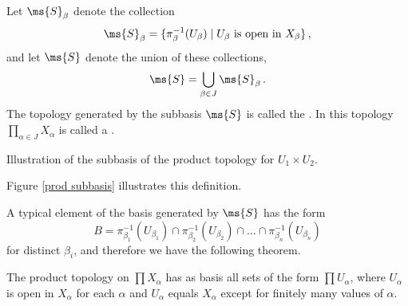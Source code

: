 \begin{definition}
	Let $\ms{S}_\beta$ denote the collection
	\[
		\ms{S}_\beta = \{ \pi_\beta^{-1}(U_\beta) \mid U_\beta 
		\text{ 
		is open in } X_\beta \}\,,
	\]
	and let $\ms{S}$ denote the union of these collections,
	\[
		\ms{S} = \bigcup_{\beta \in J} \ms{S}_\beta\,.
	\]
	The topology generated by the subbasis $\ms{S}$ is called the 
	. In this 
	topology $\prod_{\alpha \in J} X_\alpha$ is called a 
	.
\end{definition}

\begin{marginfigure}
	\centering
	\caption{Illustration of the subbasis of the 
	product topology for $U_1 \times U_2$.}\label{prod subbasis}
\end{marginfigure}

Figure \ref{prod subbasis} illustrates this definition.

A typical element of the basis generated by $\ms{S}$ has the form
\[
	B = \pi_{\beta_1}^{-1}(U_{\beta_1}) \cap 
	\pi_{\beta_2}^{-1}(U_{\beta_2}) \cap 
	\dots \cap 
	\pi_{\beta_n}^{-1}(U_{\beta_n})
\]
for distinct $\beta_i$, and therefore we have the following theorem.

\begin{theorem}
	The product topology on $\prod 	X_\alpha$ has as basis all sets 
	of the form $\prod U_\alpha$, where $U_\alpha$ is open in 
	$X_\alpha$ for each $\alpha$ and $U_\alpha$ equals $X_\alpha$ 
	except for finitely many values of $\alpha$.
\end{theorem}

